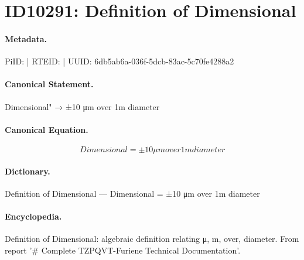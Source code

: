\section*{ID10291: Definition of Dimensional}
\paragraph{Metadata.}
PiID:  | RTEID:  | UUID: 6db5ab6a-036f-5dcb-83ac-5c70fe4288a2

\paragraph{Canonical Statement.}
Dimensional" → ±10 μm over 1m diameter

\paragraph{Canonical Equation.}
\[
Dimensional = ±10 μm over 1m diameter
\]

\paragraph{Dictionary.}
Definition of Dimensional — Dimensional = ±10 μm over 1m diameter

\paragraph{Encyclopedia.}
Definition of Dimensional: algebraic definition relating μ, m, over, diameter. From report '\# Complete TZPQVT-Furiene Technical Documentation'.
